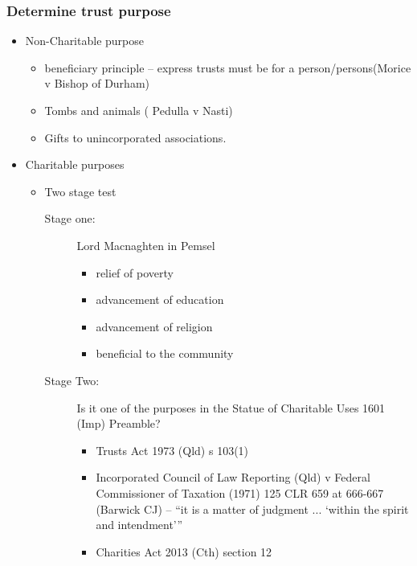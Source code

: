\subsubsection*{Determine trust purpose}
\begin{itemize}
    \item Non-Charitable purpose
        \begin{itemize}
            \item beneficiary principle -- express trusts must be for a person/persons(Morice v Bishop of Durham)
            \item Tombs and animals ( Pedulla v Nasti)
            \item Gifts to unincorporated associations. 
        \end{itemize}
    \item Charitable purposes
        \begin{itemize}
            \item Two stage test
                \begin{description}
                    \item[Stage one:] Lord Macnaghten in Pemsel 
                        \begin{itemize}
                            \item relief of poverty
                            \item advancement of education
                            \item advancement of religion
                            \item beneficial to the community
                        \end{itemize}
                    \item[Stage Two:]Is it one of the purposes in the Statue of Charitable Uses 1601 (Imp) Preamble?
                        \begin{itemize}
                            \item Trusts Act 1973 (Qld) s 103(1)
                            \item Incorporated Council of Law Reporting (Qld) v Federal Commissioner of Taxation (1971) 125 CLR 659 at 666-667 (Barwick CJ) – “it is a matter of judgment ... ‘within the spirit and intendment’”
                            \item Charities Act 2013 (Cth) section 12
                        \end{itemize}
                \end{description}
        \end{itemize}
\end{itemize}

